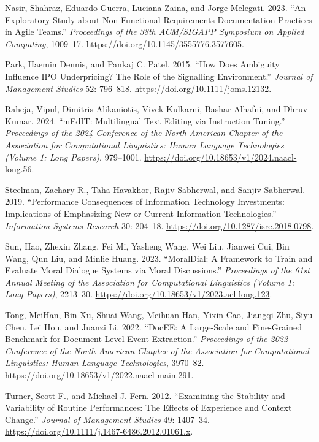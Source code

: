 \documentclass[
  12pt,
]{article}
\newlength{\cslhangindent}
\newenvironment{CSLReferences}[2] %
 {\begin{list}{}{%
  \setlength{\itemindent}{0pt}
  \setlength{\leftmargin}{0pt}
  \setlength{\parsep}{0pt}
  \ifodd #1
   \setlength{\leftmargin}{\cslhangindent}
   \setlength{\itemindent}{-1\cslhangindent}
  \fi
  \setlength{\itemsep}{#2\baselineskip}}}
 {\end{list}}
\begin{document}
\begin{CSLReferences}{1}{0}
Nasir, Shahraz, Eduardo Guerra, Luciana Zaina, and Jorge Melegati. 2023.
{``An Exploratory Study about Non-Functional Requirements Documentation
Practices in Agile Teams.''} \emph{Proceedings of the 38th ACM/SIGAPP
Symposium on Applied Computing}, 1009--17.
\url{https://doi.org/10.1145/3555776.3577605}.

Park, Haemin Dennis, and Pankaj C. Patel. 2015. {``How Does Ambiguity
Influence IPO Underpricing? The Role of the Signalling Environment.''}
\emph{Journal of Management Studies} 52: 796--818.
\url{https://doi.org/10.1111/joms.12132}.

Raheja, Vipul, Dimitris Alikaniotis, Vivek Kulkarni, Bashar Alhafni, and
Dhruv Kumar. 2024. {``mEdIT: Multilingual Text Editing via Instruction
Tuning.''} \emph{Proceedings of the 2024 Conference of the North
American Chapter of the Association for Computational Linguistics: Human
Language Technologies (Volume 1: Long Papers)}, 979--1001.
\url{https://doi.org/10.18653/v1/2024.naacl-long.56}.

Steelman, Zachary R., Taha Havakhor, Rajiv Sabherwal, and Sanjiv
Sabherwal. 2019. {``Performance Consequences of Information Technology
Investments: Implications of Emphasizing New or Current Information
Technologies.''} \emph{Information Systems Research} 30: 204--18.
\url{https://doi.org/10.1287/isre.2018.0798}.

Sun, Hao, Zhexin Zhang, Fei Mi, Yasheng Wang, Wei Liu, Jianwei Cui, Bin
Wang, Qun Liu, and Minlie Huang. 2023. {``MoralDial: A Framework to
Train and Evaluate Moral Dialogue Systems via Moral Discussions.''}
\emph{Proceedings of the 61st Annual Meeting of the Association for
Computational Linguistics (Volume 1: Long Papers)}, 2213--30.
\url{https://doi.org/10.18653/v1/2023.acl-long.123}.

Tong, MeiHan, Bin Xu, Shuai Wang, Meihuan Han, Yixin Cao, Jiangqi Zhu,
Siyu Chen, Lei Hou, and Juanzi Li. 2022. {``DocEE: A Large-Scale and
Fine-Grained Benchmark for Document-Level Event Extraction.''}
\emph{Proceedings of the 2022 Conference of the North American Chapter
of the Association for Computational Linguistics: Human Language
Technologies}, 3970--82.
\url{https://doi.org/10.18653/v1/2022.naacl-main.291}.

Turner, Scott F., and Michael J. Fern. 2012. {``Examining the Stability
and Variability of Routine Performances: The Effects of Experience and
Context Change.''} \emph{Journal of Management Studies} 49: 1407--34.
\url{https://doi.org/10.1111/j.1467-6486.2012.01061.x}.


\end{CSLReferences}
\end{document}
